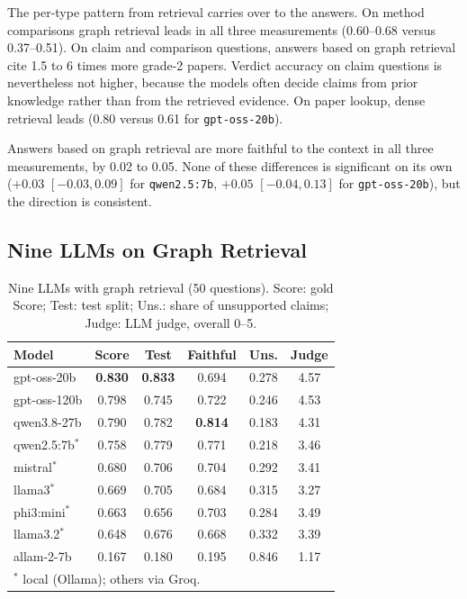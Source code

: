 The per-type pattern from retrieval carries over to the answers. On method
comparisons graph retrieval leads in all three measurements (0.60--0.68 versus
0.37--0.51). On claim and comparison questions, answers based on graph
retrieval cite 1.5 to 6 times more grade-2 papers. Verdict accuracy on claim
questions is nevertheless not higher, because the models often decide claims
from prior knowledge rather than from the retrieved evidence. On paper lookup,
dense retrieval leads (0.80 versus 0.61 for \texttt{gpt-oss-20b}).

Answers based on graph retrieval are more faithful to the context in all three
measurements, by 0.02 to 0.05. None of these differences is significant on its
own ($+0.03$ $[-0.03, 0.09]$ for \texttt{qwen2.5:7b}, $+0.05$ $[-0.04, 0.13]$ for
\texttt{gpt-oss-20b}), but the direction is consistent.

\subsection{Nine LLMs on Graph Retrieval}

\begin{table}[t]
\caption{Nine LLMs with graph retrieval (50 questions). Score: gold Score; Test: test split; Uns.: share of unsupported claims; Judge: LLM judge, overall 0--5.}
\label{tab:models}
\centering
\setlength{\tabcolsep}{4pt}
\begin{tabular}{lccccc}
\hline
Model & Score & Test & Faithful & Uns. & Judge \\
\hline
gpt-oss-20b      & \textbf{0.830} & \textbf{0.833} & 0.694 & 0.278 & 4.57 \\
gpt-oss-120b     & 0.798 & 0.745 & 0.722 & 0.246 & 4.53 \\
qwen3.8-27b      & 0.790 & 0.782 & \textbf{0.814} & 0.183 & 4.31 \\
qwen2.5:7b$^\ast$ & 0.758 & 0.779 & 0.771 & 0.218 & 3.46 \\
mistral$^\ast$   & 0.680 & 0.706 & 0.704 & 0.292 & 3.41 \\
llama3$^\ast$    & 0.669 & 0.705 & 0.684 & 0.315 & 3.27 \\
phi3:mini$^\ast$ & 0.663 & 0.656 & 0.703 & 0.284 & 3.49 \\
llama3.2$^\ast$  & 0.648 & 0.676 & 0.668 & 0.332 & 3.39 \\
allam-2-7b       & 0.167 & 0.180 & 0.195 & 0.846 & 1.17 \\
\hline
\multicolumn{6}{l}{\footnotesize $^\ast$ local (Ollama); others via Groq.}
\end{tabular}
\end{table}

